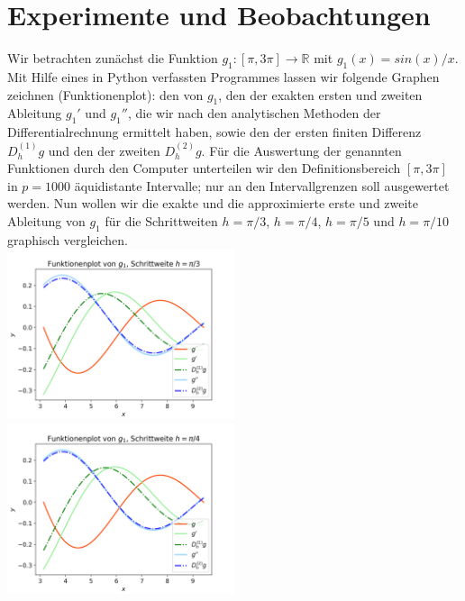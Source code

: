 \documentclass{scrartcl}
\begin{document}
\pagebreak \section{Experimente und Beobachtungen}
\label{sec:experimente}

Wir betrachten zunächst die Funktion $g_1:[\pi, 3\pi] \rightarrow \mathbb{R}$ mit $g_1(x) = sin(x)/x$. Mit Hilfe eines in Python verfassten Programmes lassen wir folgende Graphen zeichnen (Funktionenplot): den von $g_1$, den der exakten ersten und zweiten Ableitung $g_1'$ und $g_1''$, die wir nach den analytischen Methoden der Differentialrechnung ermittelt haben, sowie den der ersten finiten Differenz $D_h^{(1)}g$ und den der zweiten $D_h^{(2)}g$. Für die Auswertung der genannten Funktionen durch den Computer unterteilen wir den Definitionsbereich $[\pi, 3\pi]$ in $p = 1000$ äquidistante Intervalle; nur an den Intervallgrenzen soll ausgewertet werden. Nun wollen wir die exakte und die approximierte erste und zweite Ableitung von $g_1$ für die Schrittweiten $h = \pi/3$, $h = \pi/4$, $h = \pi/5$ und $h = \pi/10$ graphisch vergleichen. \\
\includegraphics[width=0.5\textwidth]{Grafiken/Funktionenplot_Pi_Drittel} \includegraphics[width=0.5\textwidth]{Grafiken/Funktionenplot_Pi_Viertel}\\
\end{document}
